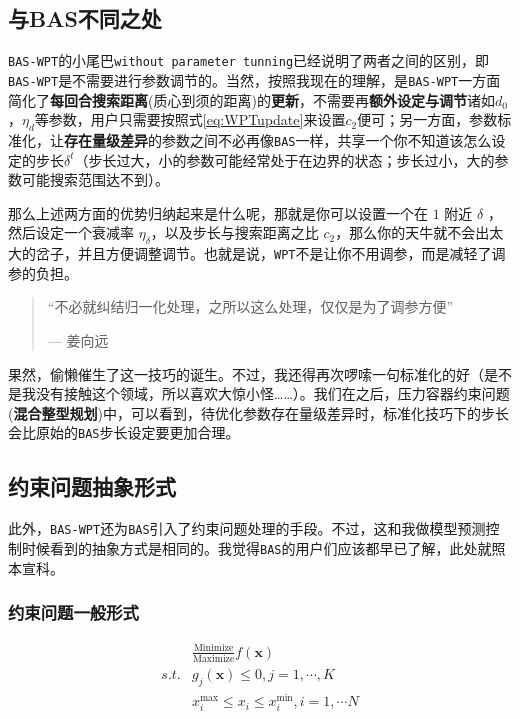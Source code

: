 \documentclass[]{ctexbook}
\begin{document}
\subsection{与BAS不同之处}\label{BASWPTflow}

\texttt{BAS-WPT}的小尾巴\texttt{without\ parameter\ tunning}已经说明了两者之间的区别，即\texttt{BAS-WPT}是不需要进行参数调节的。当然，按照我现在的理解，是\texttt{BAS-WPT}一方面简化了\textbf{每回合搜索距离}(质心到须的距离)的\textbf{更新}，不需要再\textbf{额外设定与调节}诸如\(d_0\)，\(\eta_d\)等参数，用户只需要按照式\eqref{eq:WPTupdate}来设置\(c_2\)便可；另一方面，参数标准化，让\textbf{存在量级差异}的参数之间不必再像\texttt{BAS}一样，共享一个你不知道该怎么设定的步长\(\delta^t\)（步长过大，小的参数可能经常处于在边界的状态；步长过小，大的参数可能搜索范围达不到）。

那么上述两方面的优势归纳起来是什么呢，那就是你可以设置一个在 \(1\) 附近
\(\delta\) ，然后设定一个衰减率
\(\eta_{\delta}\)，以及步长与搜索距离之比
\(c_2\)，那么你的天牛就不会出太大的岔子，并且方便调整调节。也就是说，\texttt{WPT}不是让你不用调参，而是减轻了调参的负担。

\begin{quote}
``不必就纠结归一化处理，之所以这么处理，仅仅是为了调参方便''

\begin{flushright}--- 姜向远\end{flushright}
\end{quote}

果然，偷懒催生了这一技巧的诞生。不过，我还得再次啰嗦一句标准化的好（是不是我没有接触这个领域，所以喜欢大惊小怪\ldots{}\ldots{}）。我们在之后，压力容器约束问题(\textbf{混合整型规划})中，可以看到，待优化参数存在量级差异时，标准化技巧下的步长会比原始的\texttt{BAS}步长设定要更加合理。

\subsection{约束问题抽象形式}\label{constrform}

此外，\texttt{BAS-WPT}还为\texttt{BAS}引入了约束问题处理的手段。不过，这和我做模型预测控制时候看到的抽象方式是相同的。我觉得\texttt{BAS}的用户们应该都早已了解，此处就照本宣科。

\subsubsection{约束问题一般形式}

\begin{equation}
\begin{split}
& \frac{\text{Minimize}}{\text{Maximize}} f(\mathbf{x}) \\
s.t.  & g_j(\mathbf{x})\leq 0, j=1, \cdots, K \\
& x^\text{max}_i \leq x_i \leq x^\text{min}_i, i=1, \cdots N
\end{split}
\label{eq:ConProb}
\end{equation}
\end{document}
